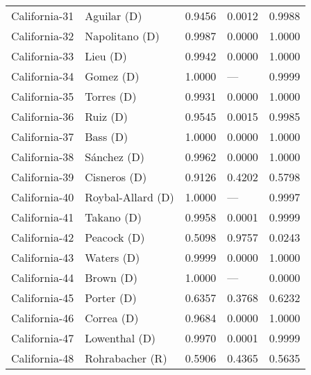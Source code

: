 \begin{longtable}{llrll}
     California-31 &          {\color{Blue} Aguilar (D)} &       0.9456 &        0.0012 &        0.9988 \\
     California-32 &       {\color{Blue} Napolitano (D)} &       0.9987 &        0.0000 &        1.0000 \\
     California-33 &             {\color{Blue} Lieu (D)} &       0.9942 &        0.0000 &        1.0000 \\
     California-34 &            {\color{Blue} Gomez (D)} &       1.0000 &           --- &        0.9999 \\
     California-35 &           {\color{Blue} Torres (D)} &       0.9931 &        0.0000 &        1.0000 \\
     California-36 &             {\color{Blue} Ruiz (D)} &       0.9545 &        0.0015 &        0.9985 \\
     California-37 &             {\color{Blue} Bass (D)} &       1.0000 &        0.0000 &        1.0000 \\
     California-38 &          {\color{Blue} Sánchez (D)} &       0.9962 &        0.0000 &        1.0000 \\
     California-39 &         {\color{Blue} Cisneros (D)} &       0.9126 &        0.4202 &        0.5798 \\
     California-40 &    {\color{Blue} Roybal-Allard (D)} &       1.0000 &           --- &        0.9997 \\
     California-41 &           {\color{Blue} Takano (D)} &       0.9958 &        0.0001 &        0.9999 \\
     California-42 &          {\color{Blue} Peacock (D)} &       0.5098 &        0.9757 &        0.0243 \\
     California-43 &           {\color{Blue} Waters (D)} &       0.9999 &        0.0000 &        1.0000 \\
     California-44 &            {\color{Blue} Brown (D)} &       1.0000 &           --- &        0.0000 \\
     California-45 &           {\color{Blue} Porter (D)} &       0.6357 &        0.3768 &        0.6232 \\
     California-46 &           {\color{Blue} Correa (D)} &       0.9684 &        0.0000 &        1.0000 \\
     California-47 &        {\color{Blue} Lowenthal (D)} &       0.9970 &        0.0001 &        0.9999 \\
     California-48 &       {\color{Red} Rohrabacher (R)} &       0.5906 &        0.4365 &        0.5635 \\

\end{longtable}
